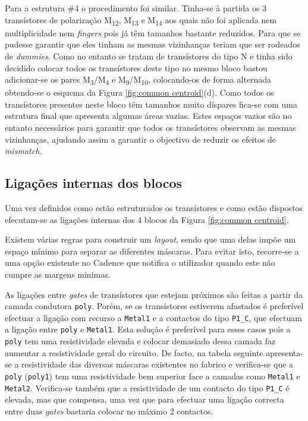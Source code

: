\documentclass[11pt]{article}
\numberwithin{equation}{section}
\begin{document}
Para a estrutura \#4 o procedimento foi similar. Tinha-se à partida os 3 transístores de polarização M\textsubscript{12}, M\textsubscript{13} e M\textsubscript{14} aos quais não foi aplicada nem multiplicidade nem \textit{fingers} pois já têm tamanhos bastante reduzidos. Para que se pudesse garantir que eles tinham as mesmas vizinhanças teriam que ser rodeados de \textit{dummies}. Como no entanto se tratam de transístores do tipo N e tinha sido decidido colocar todos os transístores deste tipo no mesmo bloco bastou adicionar-se os pares  M\textsubscript{3}/M\textsubscript{4} e  M\textsubscript{9}/M\textsubscript{10}, colocando-os de forma alternada obtendo-se o esquema da Figura \ref{fig:common centroid}(d). Como todos os transístores presentes neste bloco têm tamanhos muito díspares fica-se com uma estrutura final que apresenta algumas áreas vazias. Estes espaços vazios são no entanto necessários para garantir que todos os transístores observam as mesmas vizinhanças, ajudando assim a garantir o objectivo de reduzir os efeitos de \textit{mismatch}.

\subsection{Ligações internas dos blocos}

Uma vez definidos como estão estruturados os transístores e como estão dispostos efecutam-se as ligações internas dos 4 blocos da Figura \ref{fig:common centroid}.

Existem várias regras para construir um \textit{layout}, sendo que uma delas impõe um espaço mínimo para separar as diferentes máscaras. Para evitar isto, recorre-se a uma opção existente no Cadence que notifica o utilizador quando este não cumpre as margens mínimas. 

As ligações entre \textit{gates} de transístores que estejam próximos são feitas a partir da camada condutora \texttt{poly}. Porém, se os transístores estiverem afastados é preferível efectuar a ligação com recurso a \texttt{Metal1} e a contactos do tipo \texttt{P1\_C}, que efectuam a ligação entre \texttt{poly} e \texttt{Metal1}. Esta solução é preferível para esses casos pois a \texttt{poly} tem uma resistividade elevada e colocar demasiado dessa camada faz aumentar a resistividade geral do circuito. De facto, na tabela seguinte apresenta-se a resistividade das diversas máscaras existentes no fabrico e verifica-se que a \texttt{poly} (\texttt{poly1}) tem uma resistividade bem superior face a camadas como \texttt{Metal1} e \texttt{Metal2}. Verifica-se também que a resistividade de um contacto do tipo \texttt{P1\_C} é elevada, mas que compensa, uma vez que para efectuar uma ligação correcta entre duas \textit{gates} bastaria colocar no máximo 2 contactos.
\end{document}
